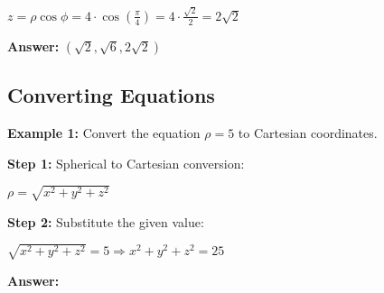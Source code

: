\documentclass[10pt]{article}                               %
\begin{document}
\begin{defaultbox}
\begin{adjustwidth}{2em}{0pt}
\begin{adjustwidth}{2em}{0pt}
\begin{examplebox}
\begin{adjustwidth}{2em}{0pt}
                        \( z = \rho\cos\phi = 4 \cdot \cos\left(\frac{\pi}{4}\right) = 4 \cdot \frac{\sqrt{2}}{2} = 2\sqrt{2} \)
    
                        \textbf{Answer:} \( \left(\sqrt{2}, \sqrt{6}, 2\sqrt{2}\right) \)
    
                    \end{adjustwidth}
    
                \end{examplebox}

                \begin{examplebox}
            
                    \subsection*{Converting Equations}
                
                    \textbf{Example 1:} Convert the equation \( \rho = 5 \) to Cartesian coordinates.
                    \vspace{0.5em}
                
                    \begin{adjustwidth}{2em}{0pt}
                
                        \textbf{Step 1:} Spherical to Cartesian conversion:
                
                        \vspace{0.25em}
                
                        \( \rho = \sqrt{x^2 + y^2 + z^2} \)
                
                        \vspace{0.5em}
                
                        \textbf{Step 2:} Substitute the given value:
                
                        \vspace{0.25em}
                
                        \( \sqrt{x^2 + y^2 + z^2} = 5 \Rightarrow x^2 + y^2 + z^2 = 25 \)
                
                        \vspace{0.5em}
                
                        \textbf{Answer:}
                
                        \vspace{0.25em}
                

\end{adjustwidth}
\end{examplebox}
\end{adjustwidth}
\end{adjustwidth}
\end{defaultbox}
\end{document}
